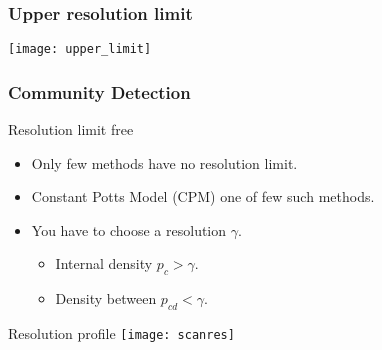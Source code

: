 \documentclass[hide notes,compress]{beamer}
\begin{document}
\begin{frame}[label=upper_resolution]
  \frametitle{Upper resolution limit}
  \texttt{[image: upper\_limit]} 
  \vskip1cm
  \begin{center}
  \end{center}
\end{frame}
\begin{frame}
  \frametitle{Community Detection}

  \begin{block}{Resolution limit free}
    \begin{itemize}
      \item Only few methods have no resolution limit.
      \item Constant Potts Model (CPM) one of few such methods.
      \item You have to choose a resolution $\gamma$.
      \begin{itemize}
        \item Internal density $p_c > \gamma$.
        \item Density between $p_{cd} < \gamma$.
      \end{itemize}
    \end{itemize}
  \end{block}
\end{frame}

\begin{frame}[c]{Resolution profile}
  \texttt{[image: scanres]}
\end{frame}

\end{document}
